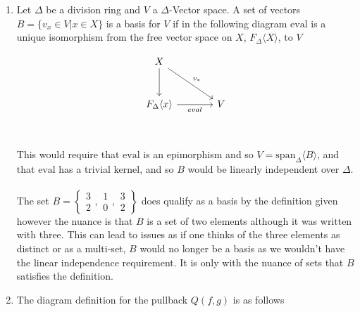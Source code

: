 \documentclass[12pt]{amsart}
\theoremstyle{definition}
\newcommand{\se}{\subseteq}
\newcommand{\ip}[1]{\langle#1\rangle}
\begin{document}
\begin{enumerate}
\item %
Let $\Delta$ be a division ring and $V$ a $\Delta$-Vector space. 
A set of vectors $B=\{v_x\in V| x\in X\}$ is a basis for $V$ if in the following diagram $\text{eval}$ is a unique isomorphism from the free vector space on $X$, $F_\Delta\ip{X}$, to $V$

\[\begin{tikzcd}[row sep=1cm, column sep=.65cm]
     X\arrow[drr, "v_*"]\arrow[d]&\\
     F_\Delta\ip x\arrow[rr, "eval"']&&V\\
    \end{tikzcd}\]
This would require that $\text{eval}$ is an epimorphism and so $V=\text{span}_\Delta\ip{B}$, and that $\text{eval}$ has a trivial kernel, and so $B$ would be linearly independent over $\Delta$.\\ \\
The set $B=\left\{\boxed{\begin{matrix}3\\ 2\end{matrix}},\boxed{\begin{matrix}1\\ 0\end{matrix}},\boxed{\begin{matrix}3\\ 2\end{matrix}}\right\}$ does qualify as a basis by the definition given however the nuance is that $B$ is a set of two elements although it was written with three. This can lead to issues as if one thinks of the three elements as distinct or as a multi-set, $B$ would no longer be a basis as we wouldn't have the linear independence requirement. It is only with the nuance of sets that $B$ satisfies the definition.\\

\item The diagram definition for the pullback $Q(f,g)$ is as follows


\end{enumerate}
\end{document}
